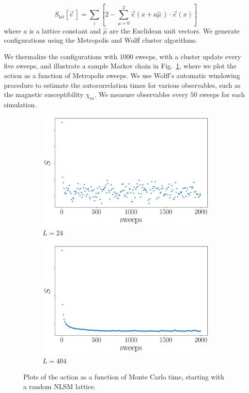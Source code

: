 \documentclass[a4paper,11pt]{article}
\newcommand{\e}{\vec e}
\begin{document}
\begin{equation}
    \label{eq:nlsm discretized action}
    S_\mathrm{lat}[\e\,] = \sum_i \left[ 2 - \sum_{\mu=0}^{2}\e(x+a\hat{\mu}\,)\cdot\e(x)  \right]
\end{equation}
where $a$ is a lattice constant and $\hat \mu$ are the Euclidean unit vectors. We generate configurations using the Metropolis \cite{metropolis1953} and Wolff cluster \cite{wolff1989} algorithms.

We thermalize the configurations with 1000 sweeps, with a cluster update every five sweeps, and illustrate a sample Markov chain in Fig.~\ref{fig:therm}, where we plot the action as a function of Metropolis sweeps. We use Wolff's automatic windowing procedure \cite{wolff2007} to estimate the autocorrelation times for various observables, such as the magnetic susceptibility $\chi_m$. We measure observables every $50$ sweeps for each simulation.
\begin{figure}[h]
  \centering
      \begin{subfigure}[b]{0.5\textwidth}\centering
        \includegraphics[width=\textwidth]{therm24.png}
        \caption{$L=24$}
      \end{subfigure}%
      \hfill
      \begin{subfigure}[b]{0.5\textwidth}\centering
        \includegraphics[width=\textwidth]{therm404.png}
        \caption{$L=404$}
      \end{subfigure}
      \hfill
      \caption{\label{fig:therm} Plots of the action as a function of Monte Carlo time, starting with a random NLSM lattice.}
\end{figure}
\end{document}
